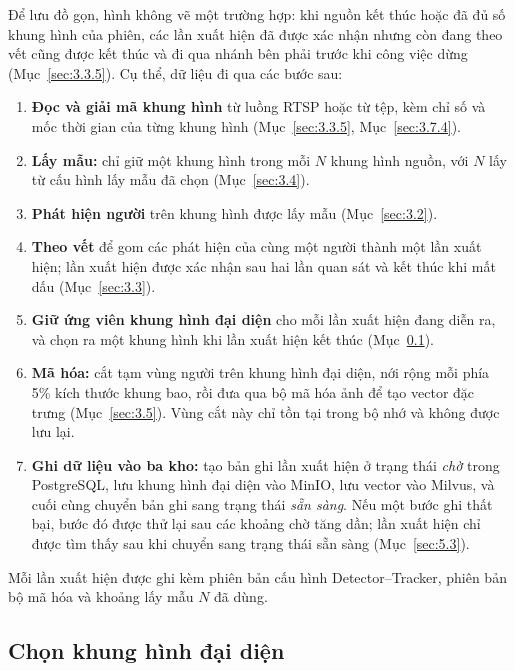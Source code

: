 Để lưu đồ gọn, hình không vẽ một trường hợp: khi nguồn kết thúc hoặc đã đủ số khung hình của phiên, các lần xuất hiện đã được xác nhận nhưng còn đang theo vết cũng được kết thúc và đi qua nhánh bên phải trước khi công việc dừng (Mục~\ref{sec:3.3.5}). Cụ thể, dữ liệu đi qua các bước sau:
\begin{enumerate}
    \item \textbf{Đọc và giải mã khung hình} từ luồng RTSP hoặc từ tệp, kèm chỉ số và mốc thời gian của từng khung hình (Mục~\ref{sec:3.3.5}, Mục~\ref{sec:3.7.4}).
    \item \textbf{Lấy mẫu:} chỉ giữ một khung hình trong mỗi $N$ khung hình nguồn, với $N$ lấy từ cấu hình lấy mẫu đã chọn (Mục~\ref{sec:3.4}).
    \item \textbf{Phát hiện người} trên khung hình được lấy mẫu (Mục~\ref{sec:3.2}).
    \item \textbf{Theo vết} để gom các phát hiện của cùng một người thành một lần xuất hiện; lần xuất hiện được xác nhận sau hai lần quan sát và kết thúc khi mất dấu (Mục~\ref{sec:3.3}).
    \item \textbf{Giữ ứng viên khung hình đại diện} cho mỗi lần xuất hiện đang diễn ra, và chọn ra một khung hình khi lần xuất hiện kết thúc (Mục~\ref{sec:5.2.2}).
    \item \textbf{Mã hóa:} cắt tạm vùng người trên khung hình đại diện, nới rộng mỗi phía 5\% kích thước khung bao, rồi đưa qua bộ mã hóa ảnh để tạo vector đặc trưng (Mục~\ref{sec:3.5}). Vùng cắt này chỉ tồn tại trong bộ nhớ và không được lưu lại.
    \item \textbf{Ghi dữ liệu vào ba kho:} tạo bản ghi lần xuất hiện ở trạng thái \emph{chờ} trong PostgreSQL, lưu khung hình đại diện vào MinIO, lưu vector vào Milvus, và cuối cùng chuyển bản ghi sang trạng thái \emph{sẵn sàng}. Nếu một bước ghi thất bại, bước đó được thử lại sau các khoảng chờ tăng dần; lần xuất hiện chỉ được tìm thấy sau khi chuyển sang trạng thái sẵn sàng (Mục~\ref{sec:5.3}).
\end{enumerate}
Mỗi lần xuất hiện được ghi kèm phiên bản cấu hình Detector--Tracker, phiên bản bộ mã hóa và khoảng lấy mẫu $N$ đã dùng.

\subsection{Chọn khung hình đại diện}
\label{sec:5.2.2}

